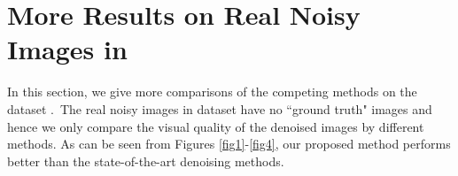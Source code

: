 \documentclass[10pt,onecolumn,letterpaper]{article}
\begin{document}

\section{More Results on Real Noisy Images in \cite{ncwebsite}}
In this section, we give more comparisons of the competing methods on the dataset \cite{ncwebsite}.\ The real noisy images in dataset \cite{ncwebsite} have no ``ground truth" images and hence we only compare the visual quality of the denoised images by different methods. As can be seen from Figures \ref{fig1}-\ref{fig4}, our proposed method performs better than the state-of-the-art denoising methods.
\end{document}
